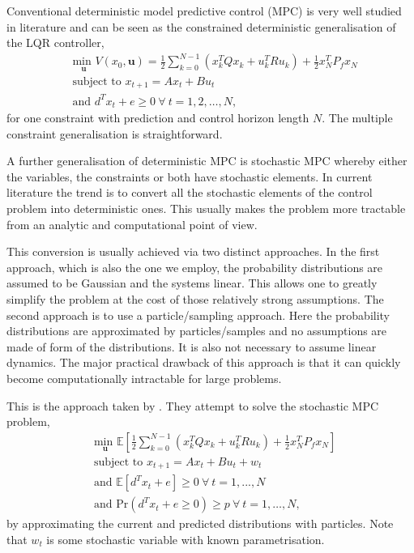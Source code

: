 Conventional deterministic model predictive control (MPC) is very well studied in literature \cite{raw} and can be seen as the constrained deterministic generalisation of the LQR controller,
\begin{equation}
\begin{aligned}
&\underset{\mathbf{u}}{\text{min }} V(x_0, \mathbf{u}) = \frac{1}{2}\sum_{k=0}^{N-1} \left( x_k^TQx_k + u_k^TRu_k \right) + \frac{1}{2}x_N^TP_fx_N \\
& \text{subject to } x_{t+1} = Ax_t+Bu_t \\
& \text{and } d^Tx_t + e \geq 0 ~\forall~t=1, 2,\hdots,N,
\end{aligned}
\label{eq_lit_mpc}
\end{equation}
for one constraint with prediction and control horizon length $N$. The multiple constraint generalisation is straightforward.

A further generalisation of deterministic MPC is stochastic MPC whereby either the variables, the constraints or both have stochastic elements. In current literature the trend is to convert all the stochastic elements of the control problem into deterministic ones. This usually makes the problem more tractable from an analytic and computational point of view.

This conversion is usually achieved via two distinct approaches. In the first approach, which is also the one we employ, the probability distributions are assumed to be Gaussian and the systems linear. This allows one to greatly simplify the problem at the cost of those relatively strong assumptions. The second approach is to use a particle/sampling approach. Here the probability distributions are approximated by particles/samples and no assumptions are made of form of the distributions. It is also not necessary to assume linear dynamics. The major practical drawback of this approach is that it can quickly become computationally intractable for large problems.

This is the approach taken by \cite{blackmore}. They attempt to solve the stochastic MPC problem, 
\begin{equation}
\begin{aligned}
&\underset{\mathbf{u}}{\text{min }} \mathbb{E}\left[ \frac{1}{2}\sum_{k=0}^{N-1} \left( x_k^TQx_k + u_k^TRu_k \right) + \frac{1}{2}x_N^TP_fx_N \right] \\
& \text{subject to } x_{t+1}=Ax_t+Bu_t + w_t \\
& \text{and } \mathbb{E}[d^Tx_t + e] \geq 0 ~\forall ~t=1,...,N \\
& \text{and } \text{Pr}(d^Tx_t + e \geq 0) \geq p ~\forall ~t=1,\hdots,N,
\end{aligned}
\label{eq_lit_chance_mpc_state}
\end{equation}
by approximating the current and predicted distributions with particles. Note that $w_t$ is some stochastic variable with known parametrisation.


